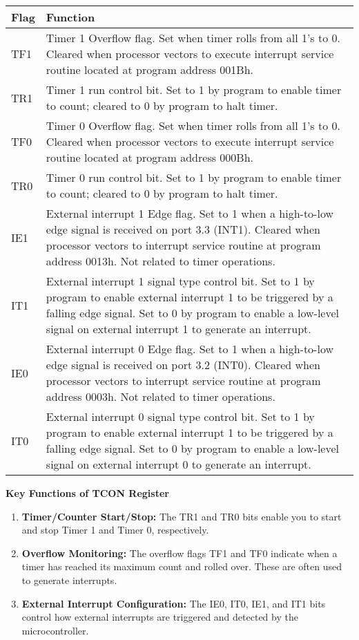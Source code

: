 \documentclass[
]{article}
\begin{document}
\begin{longtable}[]{@{}ll@{}}
\toprule
Flag & Function \\
\midrule
\endhead
TF1 & Timer 1 Overflow flag. Set when timer rolls from all 1's to 0.
Cleared when processor vectors to execute interrupt service routine
located at program address 001Bh. \\
TR1 & Timer 1 run control bit. Set to 1 by program to enable timer to
count; cleared to 0 by program to halt timer. \\
TF0 & Timer 0 Overflow flag. Set when timer rolls from all 1's to 0.
Cleared when processor vectors to execute interrupt service routine
located at program address 000Bh. \\
TR0 & Timer 0 run control bit. Set to 1 by program to enable timer to
count; cleared to 0 by program to halt timer. \\
IE1 & External interrupt 1 Edge flag. Set to 1 when a high-to-low edge
signal is received on port 3.3 (INT1). Cleared when processor vectors to
interrupt service routine at program address 0013h. Not related to timer
operations. \\
IT1 & External interrupt 1 signal type control bit. Set to 1 by program
to enable external interrupt 1 to be triggered by a falling edge signal.
Set to 0 by program to enable a low-level signal on external interrupt 1
to generate an interrupt. \\
IE0 & External interrupt 0 Edge flag. Set to 1 when a high-to-low edge
signal is received on port 3.2 (INT0). Cleared when processor vectors to
interrupt service routine at program address 0003h. Not related to timer
operations. \\
IT0 & External interrupt 0 signal type control bit. Set to 1 by program
to enable external interrupt 1 to be triggered by a falling edge signal.
Set to 0 by program to enable a low-level signal on external interrupt 0
to generate an interrupt. \\
\bottomrule
\end{longtable}

\textbf{Key Functions of TCON Register}

\begin{enumerate}
\def\labelenumi{\arabic{enumi}.}
\item
  \textbf{Timer/Counter Start/Stop:} The TR1 and TR0 bits enable you to
  start and stop Timer 1 and Timer 0, respectively.
\item
  \textbf{Overflow Monitoring:} The overflow flags TF1 and TF0 indicate
  when a timer has reached its maximum count and rolled over. These are
  often used to generate interrupts.
\item
  \textbf{External Interrupt Configuration:} The IE0, IT0, IE1, and IT1
  bits control how external interrupts are triggered and detected by the
  microcontroller.
\end{enumerate}
\end{document}
